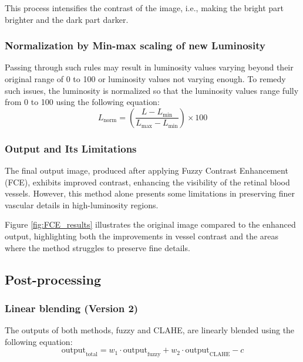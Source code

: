This process intensifies the contrast of the image, i.e., making the bright part brighter and the dark part darker.

\subsubsection{Normalization by Min-max scaling of new Luminosity}
Passing through such rules may result in luminosity values varying beyond their original range of 0 to 100 or luminosity values not varying enough. To remedy such issues, the luminosity is normalized so that the luminosity values range fully from 0 to 100 using the following equation:
\begin{equation}
    L_{\text{norm}} = \left( \frac{L - L_{\min}}{L_{\max} - L_{\min}} \right) \times 100
    \label{eq:lnorm}
\end{equation}

\subsubsection{Output and Its Limitations}
The final output image, produced after applying Fuzzy Contrast Enhancement (FCE), exhibits improved contrast, enhancing the visibility of the retinal blood vessels. However, this method alone presents some limitations in preserving finer vascular details in high-luminosity regions.

Figure \ref{fig:FCE_results} illustrates the original image compared to the enhanced output, highlighting both the improvements in vessel contrast and the areas where the method struggles to preserve fine details.



\subsection{Post-processing}
\subsubsection{Linear blending (Version 2)}
\label{subsec:version_2}

The outputs of both methods, fuzzy and CLAHE, are linearly blended using the following equation:
\begin{equation}
    \text{output}_{\text{total}} = w_{1} \cdot \text{output}_{\text{fuzzy}} + w_{2} \cdot \text{output}_{\text{CLAHE}} - c
    \label{eq:output_total}
\end{equation}

